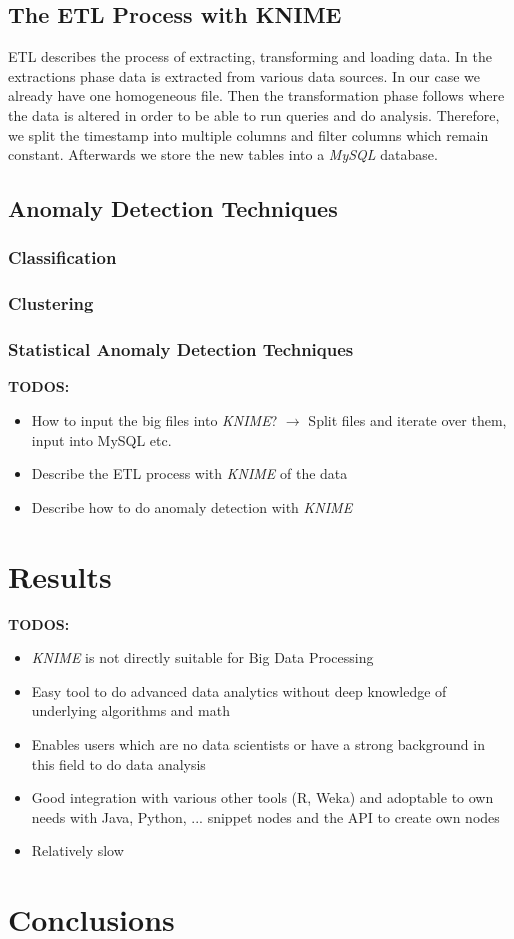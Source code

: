 \documentclass{dima}
\begin{document}
\subsection{The ETL Process with KNIME}
ETL describes the process of extracting, transforming and loading data. In the extractions phase data is extracted from various data sources. In our case we already have one homogeneous file. Then the transformation phase follows where the data is altered in order to be able to run queries and do analysis. Therefore, we split the timestamp into multiple columns and filter columns which remain constant. Afterwards we store the new tables into a \textit{MySQL} database.


\subsection{Anomaly Detection Techniques}
\subsubsection{Classification}
\subsubsection{Clustering}
\subsubsection{Statistical Anomaly Detection Techniques}

\textbf{TODOS:}
\begin{itemize}
\item How to input the big files into \textit{KNIME}? $\rightarrow$ Split files and iterate over them, input into MySQL etc.
\item Describe the ETL process with \textit{KNIME} of the data
\item Describe how to do anomaly detection with \textit{KNIME}
\end{itemize}

\section{Results}
\textbf{TODOS:}
\begin{itemize}
\item \textit{KNIME} is not directly suitable for Big Data Processing
\item Easy tool to do advanced data analytics without deep knowledge of underlying algorithms and math
\item Enables users which are no data scientists or have a strong background in this field to do data analysis
\item Good integration with various other tools (R, Weka) and adoptable to own needs with Java, Python, ... snippet nodes and the API to create own nodes
\item Relatively slow
\end{itemize}


\section{Conclusions}



\end{document}
